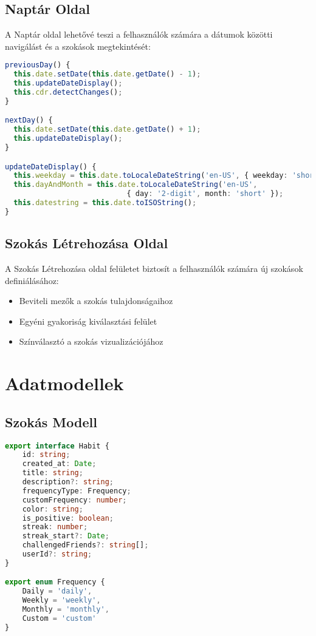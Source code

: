 \documentclass[12pt,a4paper]{report}
\begin{document}
\section{Naptár Oldal}
A Naptár oldal lehetővé teszi a felhasználók számára a dátumok közötti navigálást és a szokások megtekintését:

\begin{lstlisting}[language=typescript]
previousDay() {
  this.date.setDate(this.date.getDate() - 1);
  this.updateDateDisplay();
  this.cdr.detectChanges();
}

nextDay() {
  this.date.setDate(this.date.getDate() + 1);
  this.updateDateDisplay();
}

updateDateDisplay() {
  this.weekday = this.date.toLocaleDateString('en-US', { weekday: 'short' });
  this.dayAndMonth = this.date.toLocaleDateString('en-US', 
                            { day: '2-digit', month: 'short' });
  this.datestring = this.date.toISOString();
}
\end{lstlisting}

\section{Szokás Létrehozása Oldal}
A Szokás Létrehozása oldal felületet biztosít a felhasználók számára új szokások definiálásához:
\begin{itemize}
    \item Beviteli mezők a szokás tulajdonságaihoz
    \item Egyéni gyakoriság kiválasztási felület
    \item Színválasztó a szokás vizualizációjához
\end{itemize}

\chapter{Adatmodellek}

\section{Szokás Modell}
\begin{lstlisting}[language=typescript]
export interface Habit {
    id: string;
    created_at: Date;
    title: string;
    description?: string;
    frequencyType: Frequency;
    customFrequency: number;
    color: string;
    is_positive: boolean;
    streak: number;
    streak_start?: Date;
    challengedFriends?: string[];
    userId?: string;
}

export enum Frequency {
    Daily = 'daily',
    Weekly = 'weekly',
    Monthly = 'monthly',
    Custom = 'custom'
}
\end{lstlisting}
\end{document}
